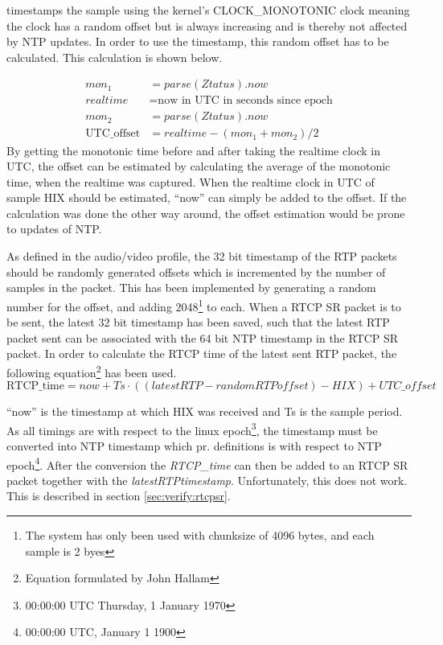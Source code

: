  timestamps the sample using the kernel's CLOCK\_MONOTONIC clock meaning the clock has a random offset but is always increasing and is thereby not affected by \ac{NTP} updates. In order to use the timestamp, this random offset has to be calculated. This calculation is shown below.

\begin{align}
	mon_1 &= parse(Ztatus).now \\
	realtime &= \text{now in UTC in seconds since epoch} \\
	mon_2 &= parse(Ztatus).now \\
	\text{UTC\_offset} &= realtime-(mon_1+mon_2)/2 
\end{align}
By getting the monotonic time before and after taking the realtime clock in UTC, the offset can be estimated by calculating the average of the monotonic time, when the realtime was captured. When the realtime clock in UTC of sample HIX should be estimated, ``now'' can simply be added to the offset.  If the calculation was done the other way around, the offset estimation would be prone to updates of NTP.

As defined in the audio/video profile, the 32 bit timestamp of the RTP packets should be randomly generated offsets which is incremented by the number of samples in the packet. This has been implemented by generating a random number for the offset, and adding 2048\footnote{The system has only been used with chunksize of 4096 bytes, and each sample is 2 byes} to each. When a RTCP SR packet is to be sent, the latest 32 bit timestamp has been saved, such that the latest RTP packet sent can be associated with the 64 bit NTP timestamp in the RTCP SR packet. In order to calculate the RTCP time of the latest sent RTP packet, the following equation\footnote{Equation formulated by John Hallam} has been used.
\begin{equation}
	\text{RTCP\_time} = now + Ts\cdot((latestRTP-\textit{randomRTPoffset})-HIX)+\textit{UTC\_offset}
\end{equation} 

``now'' is the timestamp at which HIX was received and Ts is the sample period.
As all timings are with respect to the linux epoch\footnote{00:00:00 UTC Thursday, 1 January 1970}, the timestamp must be converted into NTP timestamp  which pr. definitions is with respect to NTP epoch\footnote{00:00:00 UTC, January 1 1900}. After the conversion the \textit{RTCP\_time} can then be added to an RTCP SR packet together with the \textit{latestRTPtimestamp}. 
Unfortunately, this does not work. This is described in section \ref{sec:verify:rtcpsr}.

